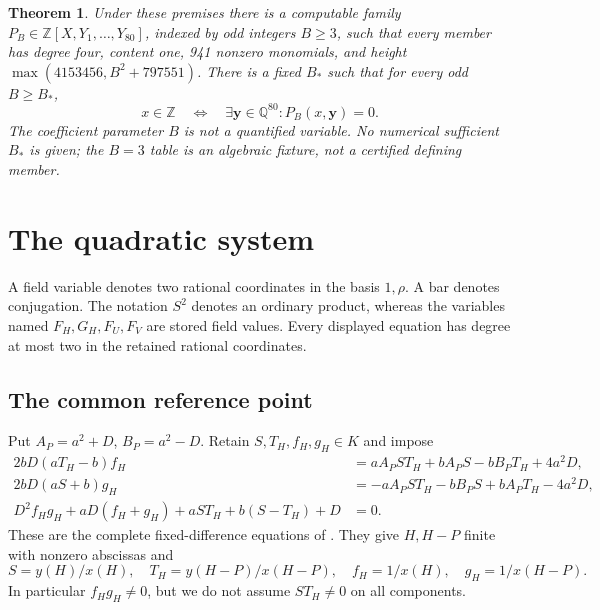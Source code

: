 \documentclass[11pt,a4paper]{article}
\newtheorem{theorem}{Theorem}[section]\newtheorem{lemma}[theorem]{Lemma}\newtheorem{proposition}[theorem]{Proposition}
\newcommand{\Q}{\mathbb Q}\newcommand{\Z}{\mathbb Z}\DeclareMathOperator{\Tr}{Tr}\DeclareMathOperator{\Nm}{Nm}\DeclareMathOperator{\rad}{rad}
\begin{document}
\begin{theorem}\label{thm:main}
Under these premises there is a computable family
$P_B\in\Z[X,Y_1,\ldots,Y_{80}]$, indexed by odd integers $B\ge3$,
such that every member has degree four, content one, 941 nonzero
monomials, and height $\max(4153456,B^2+797551)$.
There is a fixed $B_*$ such that for every odd $B\ge B_*$,
\[
 x\in\Z\quad\Longleftrightarrow\quad
 \exists\boldsymbol y\in\Q^{80}:P_B(x,\boldsymbol y)=0.
\]
The coefficient parameter $B$ is not a quantified variable. No
numerical sufficient $B_*$ is given; the $B=3$ table is an algebraic
fixture, not a certified defining member.
\end{theorem}

\section{The quadratic system}
A field variable denotes two rational coordinates in the basis
$1,\rho$. A bar denotes conjugation. The notation $S^2$ denotes
an ordinary product, whereas the variables named $F_H,G_H,F_U,F_V$
are stored field values. Every displayed equation has degree at most
two in the retained rational coordinates.

\subsection{The common reference point}
Put $A_P=a^2+D$, $B_P=a^2-D$. Retain $S,T_H,f_H,g_H\in K$ and impose
\begin{align}
 2bD(aT_H-b)f_H&=aA_PST_H+bA_PS-bB_PT_H+4a^2D,\\
 2bD(aS+b)g_H&=-aA_PST_H-bB_PS+bA_PT_H-4a^2D,\\
 D^2f_Hg_H+aD(f_H+g_H)+aST_H+b(S-T_H)+D&=0.\label{eq:common}
\end{align}
These are the complete fixed-difference equations of \cite{Common}.
They give $H,H-P$ finite with nonzero abscissas and
\[
 S=y(H)/x(H),\quad T_H=y(H-P)/x(H-P),\quad
 f_H=1/x(H),\quad g_H=1/x(H-P).
\]
In particular $f_Hg_H\ne0$, but we do not assume $S T_H\ne0$ on
all components.
\end{document}
